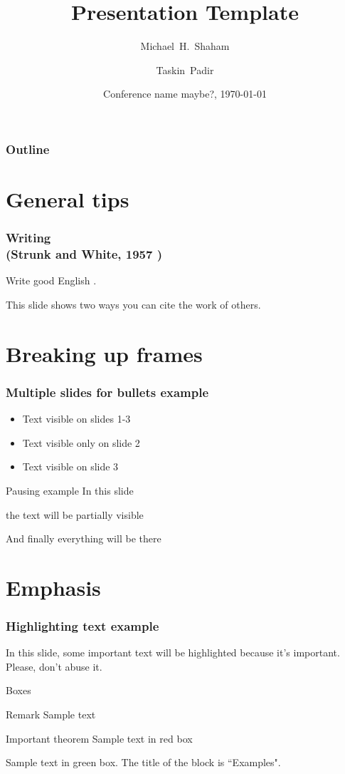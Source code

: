 \documentclass[mathserif,aspectratio=169]{beamer}
\title[Presentation Template] %
{\bfseries Presentation Template}
\author[Shaham, Michael] %
{Michael~H.~Shaham\inst{1} \and Taskin~Padir\inst{2}}
\institute[NU] %
{
  \inst{1}%
  RIVeR Lab\\
  Northeastern University
  \and
  \inst{2}%
  Director, Institute for Experiential Robotics\\
  Northeastern University
}
\date[Conf 2022] %
{Conference name maybe?, \monthyeardate\today} %
\begin{document}
\frame{\titlepage}

\begin{frame}
\frametitle{Outline}
\tableofcontents
\end{frame}

\section{General tips}

\begin{frame}
\frametitle{Writing\\[-0.3em] 
{\footnotesize \textmd{(Strunk and White, 1957 \cite{SW:57})}}}
Write good English \cite{SW:57}. 

This slide shows two ways you can cite the work of others.
\end{frame}

\section{Breaking up frames}

\begin{frame}
\frametitle{Multiple slides for bullets example}
\begin{itemize}
    \item<1-> Text visible on slides 1-3
    \item<2> Text visible only on slide 2
    \item<3-> Text visible on slide 3
\end{itemize}
\end{frame}

\begin{frame}{Pausing example}
In this slide \pause

the text will be partially visible \pause

And finally everything will be there
\end{frame}

\section{Emphasis}

\begin{frame}
\frametitle{Highlighting text example}
In this slide, some important text will be
\alert{highlighted} because it's important.
Please, don't abuse it.
\end{frame}

\begin{frame}{Boxes}

\begin{block}{Remark}
Sample text
\end{block}

\begin{alertblock}{Important theorem}
Sample text in red box
\end{alertblock}

\begin{examples}
Sample text in green box. The title of the block is ``Examples".
\end{examples}
\end{frame}
\end{document}
